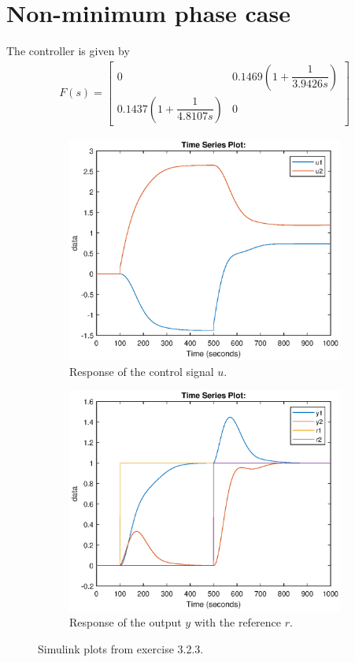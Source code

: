 \documentclass[11pt,a4paper]{article}
\begin{document}
\section*{Non-minimum phase case}
\par The controller is given by
\begin{align*}
	F(s) = \begin{bmatrix}
    	0 & 0.1469(1+\dfrac{1}{3.9426s}) \\
    	0.1437(1+\dfrac{1}{4.8107s}) & 0
    \end{bmatrix}
\end{align*}
\begin{figure}[!ht]
	\footnotesize
	\centering 
	\begin{subfigure}[t]{.495\linewidth}
		\includegraphics[width=\columnwidth]{3331}
		\caption{Response of the control signal $u$.}
		\label{fig:3331}
	\end{subfigure}
	\begin{subfigure}[t]{.495\linewidth}
		\includegraphics[width=\columnwidth]{3332}
		\caption{Response of the output $y$ with the reference $r$.}
		\label{fig:3332}
	\end{subfigure}
	\caption{Simulink plots from exercise 3.2.3.}
	\label{fig:NMPSimulink}
\end{figure}
\end{document}
